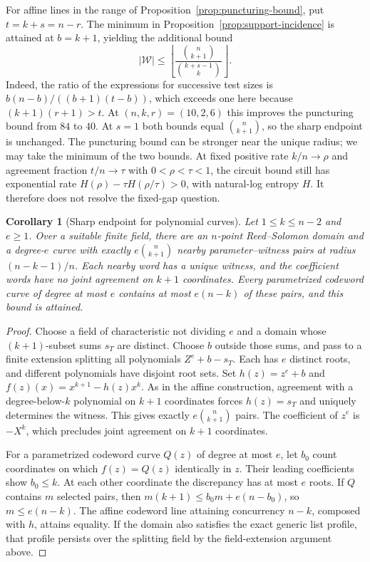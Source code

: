 \documentclass[11pt,letterpaper]{article}
\newtheorem{corollary}[theorem]{Corollary}
\theoremstyle{definition}
\theoremstyle{remark}
\begin{document}
For affine lines in the range of
Proposition~\ref{prop:puncturing-bound}, put $t=k+s=n-r$.
The minimum in Proposition~\ref{prop:support-incidence} is
attained at $b=k+1$, yielding the additional bound
\[
 |\mathcal W|\le
 \left\lfloor\frac{\binom n{k+1}}{\binom{k+s-1}{k}}\right\rfloor.
\]
Indeed, the ratio of the expressions for successive test sizes is
$b(n-b)/((b+1)(t-b))$, which exceeds one here because
$(k+1)(r+1)>t$. At $(n,k,r)=(10,2,6)$ this improves the puncturing
bound from $84$ to $40$. At $s=1$ both bounds equal
$\binom n{k+1}$, so the sharp endpoint is unchanged.
The puncturing bound can be stronger near the unique radius;
we may take the minimum of the two bounds. At fixed positive rate
$k/n\to\rho$ and agreement fraction $t/n\to\tau$ with
$0<\rho<\tau<1$, the circuit bound still has exponential rate
$H(\rho)-\tau H(\rho/\tau)>0$, with natural-log entropy $H$.
It therefore does not resolve the fixed-gap question.


\begin{corollary}[Sharp endpoint for polynomial curves]
\label{cor:curve-endpoint-sharp}
Let $1\le k\le n-2$ and $e\ge1$. Over a suitable finite field, there
are an $n$-point Reed--Solomon domain and a degree-$e$ curve with
exactly $e\binom n{k+1}$ nearby parameter--witness pairs at radius
$(n-k-1)/n$. Each nearby word has a unique witness, and the coefficient
words have no joint agreement on $k+1$ coordinates. Every parametrized
codeword curve of degree at most $e$ contains at most $e(n-k)$ of
these pairs, and this bound is attained.
\end{corollary}
\begin{proof}
Choose a field of characteristic not dividing $e$ and a domain whose
$(k+1)$-subset sums $s_T$ are distinct. Choose $b$ outside those sums,
and pass to a finite extension splitting all polynomials
$Z^e+b-s_T$. Each has $e$ distinct roots, and different polynomials
have disjoint root sets. Set $h(z)=z^e+b$ and
$f(z)(x)=x^{k+1}-h(z)x^k$. As in the affine construction, agreement
with a degree-below-$k$ polynomial on $k+1$ coordinates forces
$h(z)=s_T$ and uniquely determines the witness. This gives exactly
$e\binom n{k+1}$ pairs. The coefficient of $z^e$ is $-X^k$, which
precludes joint agreement on $k+1$ coordinates.

For a parametrized codeword curve $Q(z)$ of degree at most $e$,
let $b_0$ count coordinates on which $f(z)=Q(z)$ identically in $z$.
Their leading coefficients show $b_0\le k$. At each other coordinate
the discrepancy has at most $e$ roots. If $Q$ contains $m$ selected
pairs, then $m(k+1)\le b_0m+e(n-b_0)$, so $m\le e(n-k)$.
The affine codeword line attaining concurrency $n-k$, composed with
$h$, attains equality. If the domain also satisfies the exact generic
list profile, that profile persists over the splitting field by the
field-extension argument above.
\end{proof}
\end{document}
